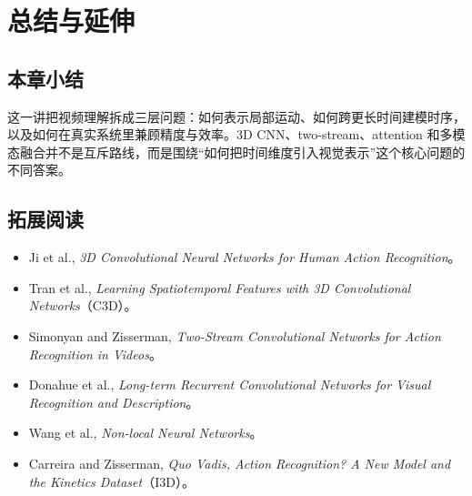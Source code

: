 \section{总结与延伸}

\subsection{本章小结}
这一讲把视频理解拆成三层问题：如何表示局部运动、如何跨更长时间建模时序，以及如何在真实系统里兼顾精度与效率。3D CNN、two-stream、attention 和多模态融合并不是互斥路线，而是围绕“如何把时间维度引入视觉表示”这个核心问题的不同答案。

\subsection{拓展阅读}

\begin{itemize}
    \item Ji et al., \textit{3D Convolutional Neural Networks for Human Action Recognition}。
    \item Tran et al., \textit{Learning Spatiotemporal Features with 3D Convolutional Networks}（C3D）。
    \item Simonyan and Zisserman, \textit{Two-Stream Convolutional Networks for Action Recognition in Videos}。
    \item Donahue et al., \textit{Long-term Recurrent Convolutional Networks for Visual Recognition and Description}。
    \item Wang et al., \textit{Non-local Neural Networks}。
    \item Carreira and Zisserman, \textit{Quo Vadis, Action Recognition? A New Model and the Kinetics Dataset}（I3D）。
\end{itemize}


